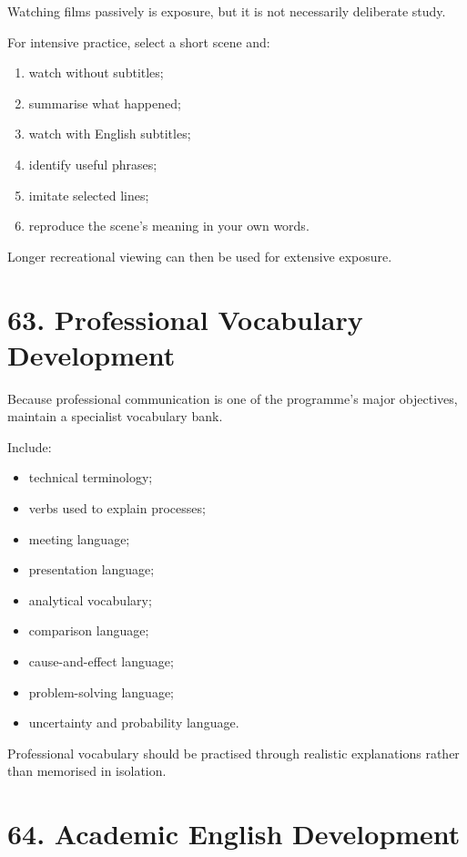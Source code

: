 Watching films passively is exposure, but it is not necessarily deliberate study.

For intensive practice, select a short scene and:

\begin{enumerate}
    \item watch without subtitles;
    \item summarise what happened;
    \item watch with English subtitles;
    \item identify useful phrases;
    \item imitate selected lines;
    \item reproduce the scene's meaning in your own words.
\end{enumerate}

Longer recreational viewing can then be used for extensive exposure.

\section*{63. Professional Vocabulary Development}

Because professional communication is one of the programme's major objectives, maintain a specialist vocabulary bank.

Include:

\begin{itemize}
    \item technical terminology;
    \item verbs used to explain processes;
    \item meeting language;
    \item presentation language;
    \item analytical vocabulary;
    \item comparison language;
    \item cause-and-effect language;
    \item problem-solving language;
    \item uncertainty and probability language.
\end{itemize}

Professional vocabulary should be practised through realistic explanations rather than memorised in isolation.

\section*{64. Academic English Development}

